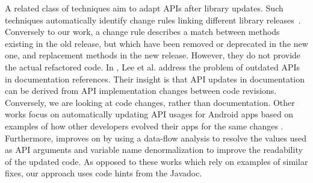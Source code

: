 \documentclass[sigconf,review,anonymous]{acmart}
\begin{document}
A related class of techniques aim to adapt APIs after library updates. Such techniques
automatically identify change rules linking different library releases~\cite{DBLP:conf/icse/WuGAK10,DBLP:conf/kbse/Huang0PW021}. Conversely to our work, a change rule describes a match between methods existing in the old release, but which have been removed or deprecated in the new
one, and replacement methods in the new release. However, they do not provide the actual refactored code.
In \cite{DBLP:journals/tse/LeeWCK21}, Lee et al. address the problem of outdated APIs in documentation references. Their insight is that API updates in documentation can be derived from API implementation changes between code revisions. Conversely, we are looking at code changes, rather than documentation.
Other works focus on automatically updating API usages for Android apps based on
examples of how other developers evolved their apps for the same changes \cite{DBLP:conf/issta/FazziniXO19,DBLP:conf/iwpc/HaryonoTKSML0J20}. 
Furthermore, \cite{DBLP:journals/ese/HaryonoTLJLKSM22} improves on \cite{DBLP:conf/iwpc/HaryonoTKSML0J20} by using a data-flow analysis 
to resolve the values used as API arguments and variable name denormalization to improve the
readability of the updated code.
As opposed to these works which rely on examples of similar fixes, our approach uses code hints from the Javadoc.

\end{document}
